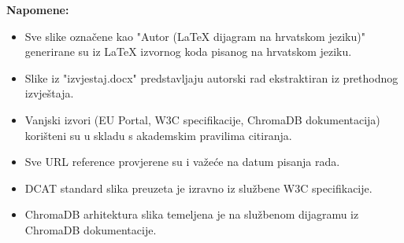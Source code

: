 \vspace{1cm}

\textbf{Napomene:}
\begin{itemize}
    \item Sve slike označene kao "Autor (LaTeX dijagram na hrvatskom jeziku)" generirane su iz LaTeX izvornog koda pisanog na hrvatskom jeziku.
    \item Slike iz "izvjestaj.docx" predstavljaju autorski rad ekstraktiran iz prethodnog izvještaja.
    \item Vanjski izvori (EU Portal, W3C specifikacije, ChromaDB dokumentacija) korišteni su u skladu s akademskim pravilima citiranja.
    \item Sve URL reference provjerene su i važeće na datum pisanja rada.
    \item DCAT standard slika preuzeta je izravno iz službene W3C specifikacije.
    \item ChromaDB arhitektura slika temeljena je na službenom dijagramu iz ChromaDB dokumentacije.
\end{itemize} 